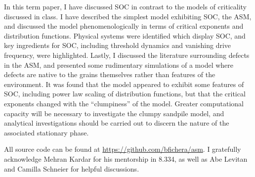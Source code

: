 \documentclass[aps,prb,reprint,superscriptaddress]{revtex4-2}
\begin{document}
In this term paper, I have discussed SOC in contrast to the models of criticality discussed in class. I have described the simplest model exhibiting SOC, the ASM, and discussed the model phenomenologically in terms of critical exponents and distribution functions. Physical systems were identified which display SOC, and key ingredients for SOC, including threshold dynamics and vanishing drive frequency, were highlighted. Lastly, I discussed the literature surrounding defects in the ASM, and presented some rudimentary simulations of a model where defects are native to the grains themselves rather than features of the environment. It was found that the model appeared to exhibit some features of SOC, including power law scaling of distribution functions, but that the critical exponents changed with the ``clumpiness'' of the model. Greater computational capacity will be necessary to investigate the clumpy sandpile model, and analytical investigations should be carried out to discern the nature of the associated stationary phase.

All source code can be found at \url{https://github.com/bfichera/asm}. I gratefully acknowledge Mehran Kardar for his mentorship in 8.334, as well as Abe Levitan and Camilla Schneier for helpful discussions. 

\end{document}
